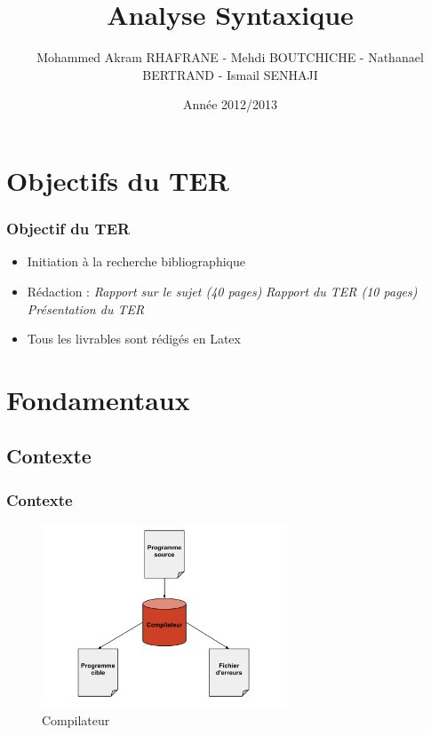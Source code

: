 \documentclass{beamer}
\title[Analyse Syntaxique]{Analyse Syntaxique}
\author{Mohammed Akram RHAFRANE - Mehdi BOUTCHICHE - Nathanael BERTRAND - Ismail SENHAJI}
\institute{Université de Toulouse III/IRIT}
\date{Année 2012/2013}
\begin{document}
\begin{frame}
  \titlepage
\end{frame}


\section{Objectifs du TER}\label{sec:Objectifs}

\begin{frame}\frametitle{Objectif du TER}

	\begin{itemize}
	\item Initiation à la recherche bibliographique\newline

	\item Rédaction :\newline
				\subitem \textit{Rapport sur le sujet (40 pages)}\newline
				\subitem \textit{Rapport du TER (10 pages)}\newline
				\subitem \textit{Présentation du TER}\newline			

	\item Tous les livrables sont rédigés en Latex
	\end{itemize}

\end{frame}

\section{Fondamentaux}

\subsection{Contexte}

\begin{frame}\frametitle{Contexte}

	\begin{figure}[h]
		\centering
			\includegraphics[width=0.65\textwidth]{compilateur.png}
		\caption{Compilateur}
		\label{fig:compilateur}
	\end{figure}\FloatBarrier

\end{frame}
\end{document}
